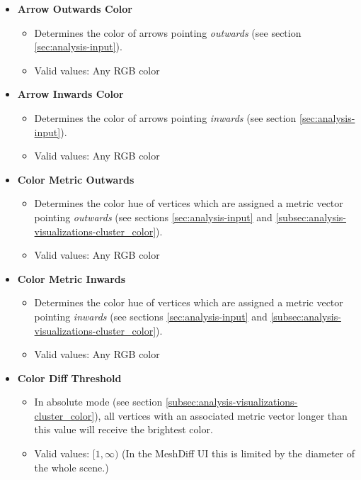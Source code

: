 \begin{itemize}
\item {\bf Arrow Outwards Color}
	\begin{itemize}
		\item Determines the color of arrows pointing {\it outwards} (see section \ref{sec:analysis-input}).
		\item Valid values: Any RGB color
	\end{itemize}

\item {\bf Arrow Inwards Color} 
	\begin{itemize}
		\item Determines the color of arrows pointing {\it inwards} (see section \ref{sec:analysis-input}).
		\item Valid values: Any RGB color
	\end{itemize}

\clearpage

\item {\bf Color Metric Outwards}
	\begin{itemize}
		\item Determines the color hue of vertices which are assigned a metric vector pointing {\it outwards} (see sections \ref{sec:analysis-input} and \ref{subsec:analysis-visualizations-cluster_color}).
		\item Valid values: Any RGB color
	\end{itemize}

\item {\bf Color Metric Inwards}
	\begin{itemize}
		\item Determines the color hue of vertices which are assigned a metric vector pointing {\it inwards} (see sections \ref{sec:analysis-input} and \ref{subsec:analysis-visualizations-cluster_color}).
		\item Valid values: Any RGB color
	\end{itemize}

\item {\bf Color Diff Threshold}
	\begin{itemize}
		\item In absolute mode (see section \ref{subsec:analysis-visualizations-cluster_color}), all vertices with an associated metric vector longer than this value will receive the brightest color.
		\item Valid values: \([1, \infty)\) (In the MeshDiff UI this is limited by the diameter of the whole scene.)
	\end{itemize}


\end{itemize}
